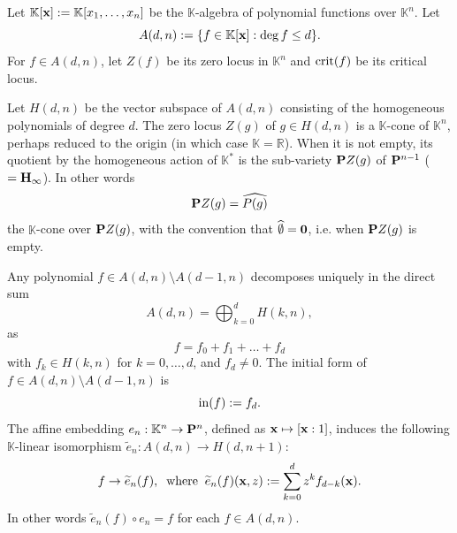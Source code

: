 \documentclass[11pt]{amsart}
\newcommand{\field}[1]{\mathbb{#1}}
\newcommand{\K}{\field{K}}
\newcommand{\R}{\field{R}}
\newcommand{\wh}[1]{\widehat{#1}}
\newcommand{\wt}[1]{\widetilde{#1}}
\newcommand{\bbo}{{\bf 0}}
\newcommand{\bH}{{\bf H}}
\newcommand{\bP}{{\bf P}}
\newcommand{\bx}{{\bf x}}
\newcommand{\crit}{{\rm crit}}
\newcommand{\ini}{{\rm in}}
\newcommand{\Kn}{{\K^n}}
\numberwithin{equation}{section}
\numberwithin{equation}{section}
\begin{document}
Let $\K[\bx] := \K[x_1,\ldots,x_n]$ be the $\K$-algebra of polynomial 
functions over $\K^n$. Let 
$$
A(d,n) := \{f \in \K[\bx] : \deg f \leq d\}.
$$
For $f \in A(d,n)$, let $Z(f)$ be its zero locus in $\K^n$ and $\crit(f)$
be its critical locus.

\bigskip
Let $H(d,n)$ be the vector subspace of $A(d,n)$ consisting of the homogeneous
polynomials of degree $d$. 
The zero locus $Z(g)$ of $g \in H(d,n)$ is a $\K$-cone of $\K^n$, perhaps 
reduced to the origin (in which case  $\K=\R$). When it is not empty, its 
quotient by the homogeneous action of $\K^*$ is the sub-variety 
$\bP Z(g)$ of $\bP^{n-1}$ ($=\bH_\infty$). In other words
$$
\bP Z(g) = \wh{P(g)} 
$$
the $\K$-cone over $\bP Z(g)$, with the convention that $\wh{\emptyset} = 
\bbo$, i.e. when $\bP Z(g)$ is empty. 

\medskip
Any polynomial $f \in A(d,n)\setminus A(d-1,n)$ decomposes uniquely 
in the direct sum
$$
A(d,n) = \bigoplus_{k=0}^d H(k,n),
$$
as 
$$
f = f_0 + f_1 + \ldots + f_d
$$ 
with $f_k \in H(k,n)$ for $k=0,\ldots,d$, and $f_d \neq 0$. The initial 
form of $f\in A(d,n)\setminus A(d-1,n)$ is
$$
\ini(f) := f_d.
$$
The affine embedding $e_n:\Kn \to \bP^n$, defined as $\bx \mapsto [\bx:1]$, 
induces the following $\K$-linear isomorphism $\wt{e}_n : A(d,n) \to 
H(d,n+1)$:
%
%
\begin{equation}\label{eq:lin-embed}
f \to \wt{e}_n(f), \;\; {\rm where} \;\; \wt{e}_n(f) (\bx,z ) :=
 \sum_{k=0}^d z^kf_{d-k}(\bx).
\end{equation} 
%
%
In other words $\wt{e}_n(f) \circ e_n = f$ for each $f\in {A(d,n)}$.
\end{document}

